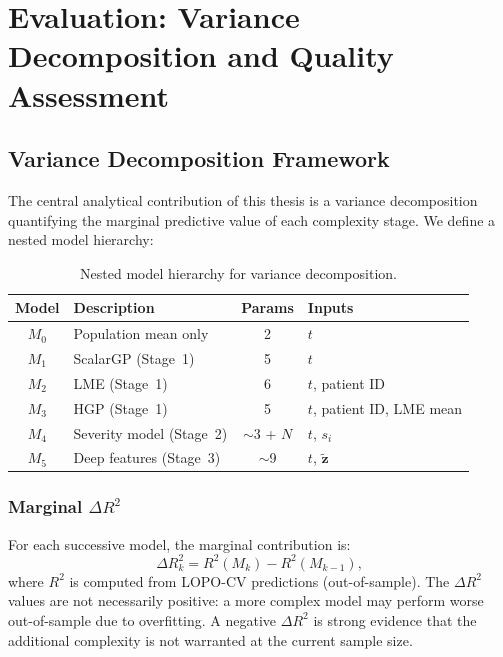\section{Evaluation: Variance Decomposition and Quality Assessment}
\label{sec:evaluation}

\subsection{Variance Decomposition Framework}
\label{sec:eval:variance}

The central analytical contribution of this thesis is a variance
decomposition quantifying the marginal predictive value of each complexity
stage. We define a nested model hierarchy:

\begin{table}[H]
  \centering
  \caption{Nested model hierarchy for variance decomposition.}
  \label{tab:model_hierarchy}
  \begin{tabular}{clcp{5.5cm}}
    \toprule
    \textbf{Model} & \textbf{Description} & \textbf{Params} &
      \textbf{Inputs} \\
    \midrule
    $M_0$ & Population mean only & 2 & $t$ \\
    $M_1$ & ScalarGP (Stage~1) & 5 & $t$ \\
    $M_2$ & LME (Stage~1) & 6 & $t$, patient ID \\
    $M_3$ & HGP (Stage~1) & 5 & $t$, patient ID, LME mean \\
    $M_4$ & Severity model (Stage~2) & $\sim$3 + $N$ & $t$, $s_i$ \\
    $M_5$ & Deep features (Stage~3) & $\sim$9 & $t$, $\tilde{\mathbf{z}}$ \\
    \bottomrule
  \end{tabular}
\end{table}

\subsubsection{Marginal $\Delta R^2$}

For each successive model, the marginal contribution is:
\begin{equation}
  \Delta R^2_k = R^2(M_k) - R^2(M_{k-1}),
  \label{eq:delta_r2}
\end{equation}
where $R^2$ is computed from LOPO-CV predictions (out-of-sample). The
$\Delta R^2$ values are not necessarily positive: a more complex model
may perform worse out-of-sample due to overfitting. A negative $\Delta R^2$
is strong evidence that the additional complexity is not warranted at the
current sample size.

